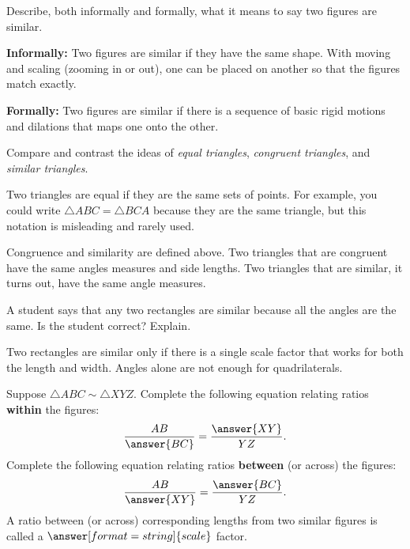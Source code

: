 \documentclass[nooutcomes]{ximera}
\begin{document}
\begin{question}
Describe, both informally and formally, what it means to say two figures are similar.
\begin{freeResponse}
\end{freeResponse}
\begin{hint}
\textbf{Informally:}  Two figures are similar if they have the same shape.  With moving and scaling (zooming in or out), one can be placed on another so that the figures match exactly.    

\textbf{Formally:}  Two figures are similar if there is a sequence of basic rigid motions and dilations that maps one onto the other.  
\end{hint}
\end{question}


\begin{question}
Compare and contrast the ideas of \textit{equal triangles},
  \textit{congruent triangles}, and \textit{similar triangles}.
\begin{freeResponse}
\end{freeResponse}
\begin{hint}
Two triangles are equal if they are the same sets of points.  For example, you could write $\triangle ABC = \triangle BCA$ because they are the same triangle, but this notation is misleading and rarely used.  

Congruence and similarity are defined above.  Two triangles that are congruent have the same angles measures and side lengths.  Two triangles that are similar, it turns out, have the same angle measures.  
\end{hint}
\end{question}

\begin{question}
A student says that any two rectangles are similar because all the angles are the same.  Is the student correct?  
 Explain. 
\begin{freeResponse}
\end{freeResponse}
\begin{hint}
Two rectangles are similar only if there is a single scale factor that works for both the length and width.  Angles alone are not enough for quadrilaterals.  
\end{hint}
\end{question}


\begin{question}
Suppose $\triangle ABC \sim \triangle XYZ$.  Complete the following equation relating ratios \textbf{within} the figures: 
\[
\frac{AB}{\answer{BC}} = \frac{\answer{XY}}{YZ}.  
\]
Complete the following equation relating ratios \textbf{between} (or across) the figures: 
\[
\frac{AB}{\answer{XY}} = \frac{\answer{BC}}{YZ}.  
\]
A ratio between (or across) corresponding lengths from two similar figures is called a $\answer[format=string]{scale}$ factor.  
\end{question}
\end{document}
